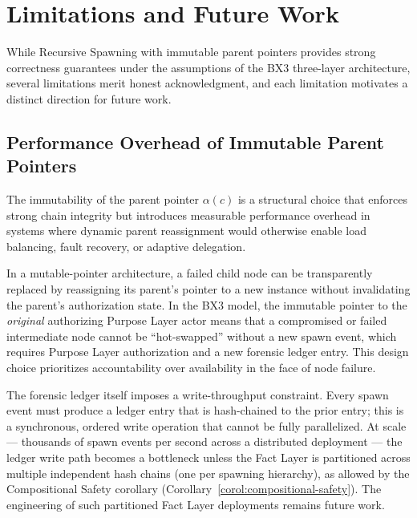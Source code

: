 \section{Limitations and Future Work}
\label{sec:limitations}

While Recursive Spawning with immutable parent pointers provides strong correctness guarantees under the assumptions of the BX3 three-layer architecture, several limitations merit honest acknowledgment, and each limitation motivates a distinct direction for future work.

\subsection{Performance Overhead of Immutable Parent Pointers}
\label{sec:limitations-performance}

The immutability of the parent pointer $\alpha(c)$ is a structural choice that enforces strong chain integrity but introduces measurable performance overhead in systems where dynamic parent reassignment would otherwise enable load balancing, fault recovery, or adaptive delegation.

In a mutable-pointer architecture, a failed child node can be transparently replaced by reassigning its parent's pointer to a new instance without invalidating the parent's authorization state. In the BX3 model, the immutable pointer to the \textit{original} authorizing Purpose Layer actor means that a compromised or failed intermediate node cannot be ``hot-swapped'' without a new spawn event, which requires Purpose Layer authorization and a new forensic ledger entry. This design choice prioritizes accountability over availability in the face of node failure.

The forensic ledger itself imposes a write-throughput constraint. Every spawn event must produce a ledger entry that is hash-chained to the prior entry; this is a synchronous, ordered write operation that cannot be fully parallelized. At scale — thousands of spawn events per second across a distributed deployment — the ledger write path becomes a bottleneck unless the Fact Layer is partitioned across multiple independent hash chains (one per spawning hierarchy), as allowed by the Compositional Safety corollary (Corollary~\ref{corol:compositional-safety}). The engineering of such partitioned Fact Layer deployments remains future work.

